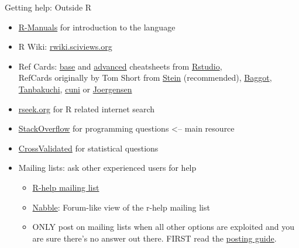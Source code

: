 \documentclass[xcolor=table,       handout,    xcolor=dvipsnames]{beamer}\usepackage[]{graphicx}\usepackage[]{color}
\begin{document}
\begin{frame}[fragile]{Getting help: Outside R}
\pause
\begin{itemize}[<+->]
  \item \href{https://cran.r-project.org/manuals.html}{R-Manuals} for introduction to the language
  \item R Wiki: \href{http://rwiki.sciviews.org/}{rwiki.sciviews.org}
  \item Ref Cards:
    \href{https://www.rstudio.com/wp-content/uploads/2016/09/r-cheat-sheet-1.pdf}{base} and
    \href{https://www.rstudio.com/wp-content/uploads/2016/02/advancedR.pdf}{advanced} cheatsheets from
    \href{https://www.rstudio.com/resources/cheatsheets/}{Rstudio},\\
    RefCards originally by Tom Short from
    \href{https://github.com/jonasstein/R-Reference-Card/raw/master/R-refcard.pdf}{Stein} (recommended),
    \href{https://cran.r-project.org/doc/contrib/Baggott-refcard-v2.pdf}{Baggot},
    \href{http://www.u.arizona.edu/~kuchi/Courses/MAT167/Files/R-refcard.pdf}{Tanbakuchi},
    \href{http://atrey.karlin.mff.cuni.cz/~morf/vyuka/pas/materialy/R-refcard.pdf}{cuni} or
    \href{http://statmaster.sdu.dk/bent/courses/ST501-2011/Rcard.pdf}{Joergensen}
	\item \href{www.rseek.org}{rseek.org} for R related internet search
  \item \href{www.StackOverflow.com}{StackOverflow} for programming questions <-- \alert{main resource}
  \item \href{www.CrossValidated.com}{CrossValidated} for statistical questions
	\item Mailing lists: ask other experienced users for help
	\begin{itemize}
  \item \href{http://www.r-project.org/mail.html}{R-help mailing list}
  \item \href{http://r.789695.n4.nabble.com/}{Nabble}: Forum-like view of the r-help mailing list
  \item ONLY post on mailing lists when all other options are exploited and you are sure there's no answer out there. FIRST read the \href{http://www.r-project.org/posting-guide.html}{posting guide}.
\end{itemize}
\end{itemize}
\label{refcards}
\end{frame}

\end{document}
